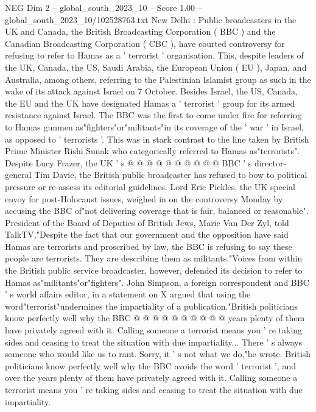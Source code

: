 \begin{textsample}{NEG Dim 2 – global\_south\_2023\_10 – Score 1.00 – global\_south\_2023\_10/102528763.txt}  \label{ex:f2_neg_272}
New Delhi : Public broadcasters in the UK and Canada, the British Broadcasting Corporation ( BBC ) and the Canadian Broadcasting Corporation ( CBC ), have courted controversy for refusing to refer to Hamas as a ' terrorist ' organisation.
This, despite leaders of the UK, Canada, the US, Saudi Arabia, the European Union ( EU ), Japan, and Australia, among others, referring to the Palestinian Islamist group as such in the wake of its attack against Israel on 7 October.
Besides Israel, the US, Canada, the EU and the UK have designated Hamas a ' terrorist ' group for its armed resistance against Israel.
The BBC was the first to come under fire for referring to Hamas gunmen as"fighters"or"militants"in its coverage of the ' war ' in Israel, as opposed to ' terrorists '.
This was in stark contrast to the line taken by British Prime Minister Rishi Sunak who categorically referred to Hamas as"terrorists".
Despite Lucy Frazer, the UK ' s @ @ @ @ @ @ @ @ @ @ BBC ' s director-general Tim Davie, the British public broadcaster has refused to bow to political pressure or re-assess its editorial guidelines.
Lord Eric Pickles, the UK special envoy for post-Holocaust issues, weighed in on the controversy Monday by accusing the BBC of"not delivering coverage that is fair, balanced or reasonable".
President of the Board of Deputies of British Jews, Marie Van Der Zyl, told TalkTV,"Despite the fact that our government and the opposition have said Hamas are terrorists and proscribed by law, the BBC is refusing to say these people are terrorists.
They are describing them as militants."Voices from within the British public service broadcaster, however, defended its decision to refer to Hamas as"militants"or"fighters".
John Simpson, a foreign correspondent and BBC ' s world affairs editor, in a statement on X argued that using the word"terrorist"undermines the impartiality of a publication."British politicians know perfectly well why the BBC @ @ @ @ @ @ @ @ @ @ years plenty of them have privately agreed with it.
Calling someone a terrorist means you ' re taking sides and ceasing to treat the situation with due impartiality...
There ' s always someone who would like us to rant.
Sorry, it ' s not what we do,"he wrote.
British politicians know perfectly well why the BBC avoids the word ' terrorist ', and over the years plenty of them have privately agreed with it.
Calling someone a terrorist means you ' re taking sides and ceasing to treat the situation with due impartiality.

\end{textsample}
